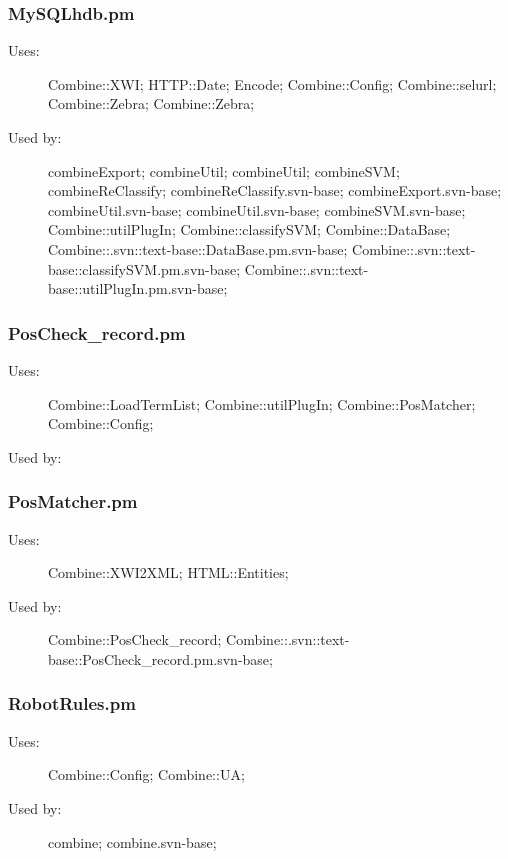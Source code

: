 \subsubsection{MySQLhdb.pm}
\begin{description}
\item[Uses:] Combine::XWI; HTTP::Date; Encode; Combine::Config; Combine::selurl; Combine::Zebra; Combine::Zebra; 

\item[Used by:] combineExport; combineUtil; combineUtil; combineSVM; combineReClassify; combineReClassify.svn-base; combineExport.svn-base; combineUtil.svn-base; combineUtil.svn-base; combineSVM.svn-base; Combine::utilPlugIn; Combine::classifySVM; Combine::DataBase; Combine::.svn::text-base::DataBase.pm.svn-base; Combine::.svn::text-base::classifySVM.pm.svn-base; Combine::.svn::text-base::utilPlugIn.pm.svn-base; 

\end{description}
\subsubsection{PosCheck\_record.pm}
\begin{description}
\item[Uses:] Combine::LoadTermList; Combine::utilPlugIn; Combine::PosMatcher; Combine::Config; 

\item[Used by:] 

\end{description}
\subsubsection{PosMatcher.pm}
\begin{description}
\item[Uses:] Combine::XWI2XML; HTML::Entities; 

\item[Used by:] Combine::PosCheck\_record; Combine::.svn::text-base::PosCheck\_record.pm.svn-base; 

\end{description}
\subsubsection{RobotRules.pm}
\begin{description}
\item[Uses:] Combine::Config; Combine::UA; 

\item[Used by:] combine; combine.svn-base; 

\end{description}
